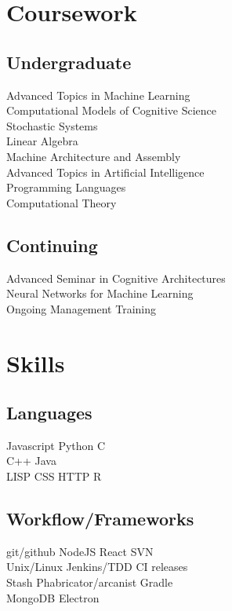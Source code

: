 \documentclass[]{csaund_resume-openfont}
\begin{document}
\begin{minipage}[t]{0.33\textwidth}
\section{Coursework}
\subsection{Undergraduate}
Advanced Topics in Machine Learning \\
Computational Models of Cognitive Science \\
Stochastic Systems \\
Linear Algebra \\
Machine Architecture and Assembly \\
Advanced Topics in Artificial Intelligence \\
Programming Languages \\
Computational Theory \\
\sectionsep

\subsection{Continuing}
Advanced Seminar in Cognitive Architectures \\
Neural Networks for Machine Learning \\
Ongoing Management Training


\section{Skills}
\subsection{Languages}
Javascript \textbullet{} Python \textbullet{} C \\
C++ \textbullet{} Java  \\
LISP \textbullet{} CSS \textbullet{} HTTP \textbullet{} R \\
\vspace{\topsep} %
\subsection{Workflow/Frameworks}
git/github \textbullet{} NodeJS  \textbullet{} React \textbullet{} SVN \textbullet{} \\
 Unix/Linux \textbullet{} Jenkins/TDD \textbullet{} CI releases \\
 Stash \textbullet{} Phabricator/arcanist \textbullet{} Gradle \\
 MongoDB \textbullet{} Electron 
\sectionsep

%
%

\end{minipage}
\end{document}
